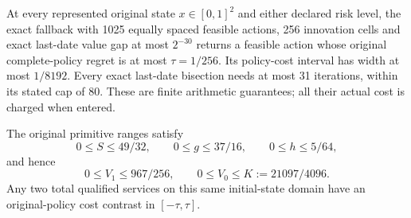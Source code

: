 \begin{proposition}
\label{prop:totalservice121}
At every represented original state \(x\in[0,1]^2\)
and either declared risk level, the exact fallback with
1025 equally spaced feasible actions, 256 innovation
cells and exact last-date value gap at most \(2^{-30}\)
returns a feasible action whose original complete-policy
regret is at most \(\tau=1/256\).
Its policy-cost interval has width at most \(1/8192\).
Every exact last-date bisection needs at most 31
iterations, within its stated cap of 80.
These are finite arithmetic guarantees; all their
actual cost is charged when entered.

The original primitive ranges satisfy
\begin{equation}\label{eq:primitiverange121}
 0\leq S\leq49/32,\qquad
 0\leq g\leq37/16,\qquad
 0\leq h\leq5/64,
\end{equation}
and hence
\[
 0\leq V_1\leq967/256,\qquad
 0\leq V_0\leq K:=21097/4096.
\]
Any two total qualified services on this same
initial-state domain have an original-policy
cost contrast in \([-\tau,\tau]\).
\end{proposition}

